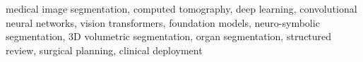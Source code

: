 medical image segmentation, computed tomography, deep learning, convolutional neural networks, vision transformers, foundation models, neuro-symbolic segmentation, 3D volumetric segmentation, organ segmentation, structured review, surgical planning, clinical deployment
